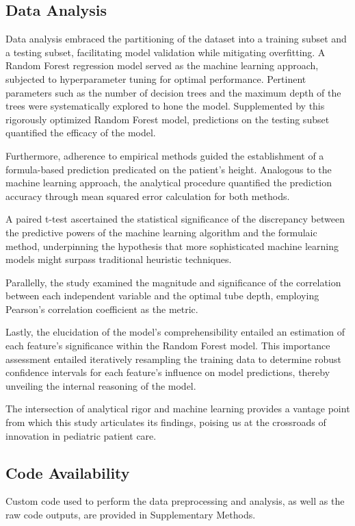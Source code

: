\documentclass[11pt]{article}
\begin{document}
\subsection*{Data Analysis}
Data analysis embraced the partitioning of the dataset into a training subset and a testing subset, facilitating model validation while mitigating overfitting. A Random Forest regression model served as the machine learning approach, subjected to hyperparameter tuning for optimal performance. Pertinent parameters such as the number of decision trees and the maximum depth of the trees were systematically explored to hone the model. Supplemented by this rigorously optimized Random Forest model, predictions on the testing subset quantified the efficacy of the model.

Furthermore, adherence to empirical methods guided the establishment of a formula-based prediction predicated on the patient's height. Analogous to the machine learning approach, the analytical procedure quantified the prediction accuracy through mean squared error calculation for both methods.

A paired t-test ascertained the statistical significance of the discrepancy between the predictive powers of the machine learning algorithm and the formulaic method, underpinning the hypothesis that more sophisticated machine learning models might surpass traditional heuristic techniques.

Parallelly, the study examined the magnitude and significance of the correlation between each independent variable and the optimal tube depth, employing Pearson's correlation coefficient as the metric.

Lastly, the elucidation of the model's comprehensibility entailed an estimation of each feature's significance within the Random Forest model. This importance assessment entailed iteratively resampling the training data to determine robust confidence intervals for each feature's influence on model predictions, thereby unveiling the internal reasoning of the model.

The intersection of analytical rigor and machine learning provides a vantage point from which this study articulates its findings, poising us at the crossroads of innovation in pediatric patient care.\subsection*{Code Availability}

Custom code used to perform the data preprocessing and analysis, as well as the raw code outputs, are provided in Supplementary Methods.
\end{document}
